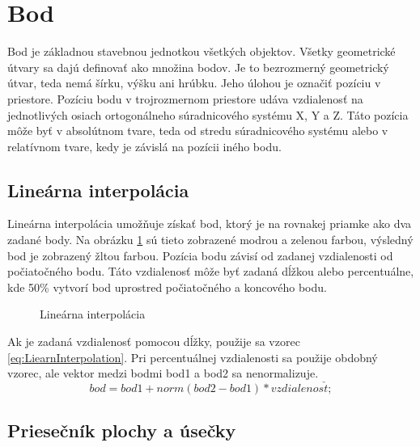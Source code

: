 \section{Bod}
Bod je základnou stavebnou jednotkou všetkých objektov. Všetky geometrické útvary sa dajú definovať ako množina bodov. Je to bezrozmerný geometrický útvar, teda nemá šírku, výšku ani hrúbku. Jeho úlohou je označiť pozíciu v priestore. Pozíciu bodu v trojrozmernom priestore udáva vzdialenosť na jednotlivých osiach ortogonálneho súradnicového systému X, Y a Z. Táto pozícia môže byť v absolútnom tvare, teda od stredu súradnicového systému alebo v relatívnom tvare, kedy je závislá na pozícii iného bodu.


\subsection*{Lineárna interpolácia}
Lineárna interpolácia umožňuje získať bod, ktorý je na rovnakej priamke ako dva zadané body. Na obrázku \ref{fig:PointLinearInterpolation} sú tieto zobrazené modrou a zelenou farbou, výsledný bod je zobrazený žltou farbou. Pozícia bodu závisí od zadanej vzdia\-le\-nos\-ti od počiatočného bodu. Táto vzdia\-le\-nosť môže byť zadaná dĺžkou alebo percentuálne, kde 50\% vytvorí bod uprostred počiatočného a koncového bodu. 




\begin{figure}[H]
	\centering
	\caption{Lineárna interpolácia}
	\label{fig:PointLinearInterpolation}
\end{figure}

Ak je zadaná vzdialenosť pomocou dĺžky, použije sa vzorec \ref{eq:LiearnInterpolation}. Pri percentuálnej vzdialenosti sa použije obdobný vzorec, ale vektor medzi bodmi bod1 a bod2 sa nenormalizuje.
\begin{equation}
    bod = bod1 + norm(bod2 - bod1) * vzdialenos\check{t};
	\label{eq:LiearnInterpolation}
\end{equation}


\subsection*{Priesečník plochy a úsečky}

